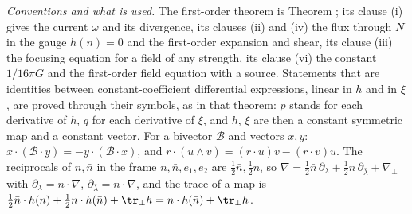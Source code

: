 \emph{Conventions and what is used.} The first-order theorem is Theorem ; its clause (i) gives the current $\omega$ and its divergence, its clauses (ii) and (iv) the flux through $N$ in the gauge $h(n) = 0$ and the first-order expansion and shear, its clause (iii) the focusing equation for a field of any strength, its clause (vi) the constant $1/16\pi G$ and the first-order field equation with a source. Statements that are identities between constant-coefficient differential expressions, linear in $h$ and in $\xi$, are proved through their symbols, as in that theorem: $p$ stands for each derivative of $h$, $q$ for each derivative of $\xi$, and $h$, $\xi$ are then a constant symmetric map and a constant vector. For a bivector $\mathcal{B}$ and vectors $x, y$: $x \cdot (\mathcal{B} \cdot y) = -y \cdot (\mathcal{B} \cdot x)$, and $r \cdot (u \wedge v) = (r \cdot u)v - (r \cdot v)u$. The reciprocals of $n, \bar n$ in the frame $n, \bar n, e_{1}, e_{2}$ are $\tfrac12\bar n, \tfrac12 n$, so $\nabla = \tfrac12\bar n\,\partial_{\lambda} + \tfrac12 n\,\partial_{\bar\lambda} + \nabla_{\perp}$ with $\partial_{\lambda} = n \cdot \nabla$, $\partial_{\bar\lambda} = \bar n \cdot \nabla$, and the trace of a map is $\tfrac12\bar n \cdot h(n) + \tfrac12 n \cdot h(\bar n) + \tr_{\perp}h = n \cdot h(\bar n) + \tr_{\perp}h$.

